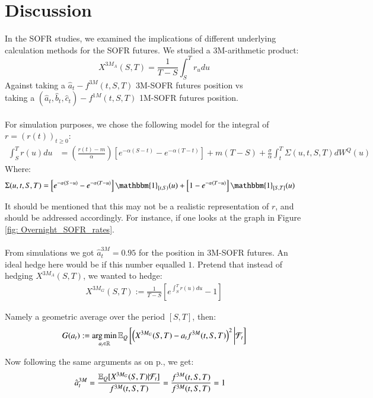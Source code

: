 \chapter{Discussion}
In the SOFR studies, we examined the implications of different underlying calculation methods for the SOFR futures. We studied a 3M-arithmetic product: 
\[
X^{3M_{A}}(S,T) = \frac{1}{T-S}\int_{S}^{T}r_{u}du
\]
Against taking  a $\hat{a}_{t}-f^{3M}(t,S,T)$ 3M-SOFR futures position vs \\ 
taking  a $(\hat{a}_{t}, \hat{b}_{t}, \hat{c}_{t})-f^{1M}(t,S,T)$ 1M-SOFR futures position.  
\\~\\
For simulation purposes, we chose the following model for the integral of $r = (r(t))_{t\geq 0}$: 
\begin{align*}
\int_{S}^{T}r(u)du 
&= 
\left(
\frac{r(t)-m}{\alpha}
\right)
\left[
e^{-\alpha(S-t)} - e^{-\alpha(T-t)}
\right]
+ m(T-S) 
+ 
\frac{\sigma}{\alpha}\int_{t}^{T}\Sigma(u,t,S,T)dW^{Q}(u)   
\end{align*}
Where: 
\begin{align*}
\Sigma(u,t,S,T) &= 
\left[
e^{-\alpha(S-u)}-e^{-\alpha(T-u)}
\right]\mathbbm{1}_{[t,S)}(u) 
+ 
\left[
1-e^{-\alpha(T-u)}
\right]\mathbbm{1}_{[S,T]}(u)
\end{align*}

It should be mentioned that this may not be a realistic representation of $r$, and should be addressed accordingly. For instance, if one looks at the graph in Figure \ref{fig: Overnight_SOFR_rates}.  
\\~\\
From simulations we got $\hat{a}_{t}^{3M} = 0.95$ for the position in 3M-SOFR futures. An ideal hedge here would be if this number equalled $1$. Pretend that instead of hedging $X^{3M_{A}}(S,T)$, we wanted to hedge: 
\begin{align*}
X^{3M_{G}}(S,T) := \frac{1}{T-S}\left[
e^{\int_{S}^{T}r(u)du}-1
\right]    
\end{align*}

Namely a geometric average over the period $[S,T]$, then: 
\begin{align*}
G(a_{t}) := \operatorname*{arg\,min}\limits_{a_{t} \in \mathbb{R}}\mathbb{E}_{Q}\left[
\left(
X^{3M_{G}}(S,T)-a_{t}f^{3M}(t,S,T)
\right)^{2}
\bigg{|}\mathcal{F}_{t}
\right]
\end{align*}

Now following the same arguments as on p.\pageref{result: optimal_SOFR_hedge_3MA_vs_3GM}, we get: 
\begin{align*}
\hat{a}_{t}^{3M} &= \frac{
\mathbb{E}_{Q}[X^{3M_{G}}(S,T)|\mathcal{F}_{t}]
}{
f^{3M}(t,S,T)
}
= 
\frac{
f^{3M}(t,S,T)
}{
f^{3M}(t,S,T)
} = 1
\end{align*}


